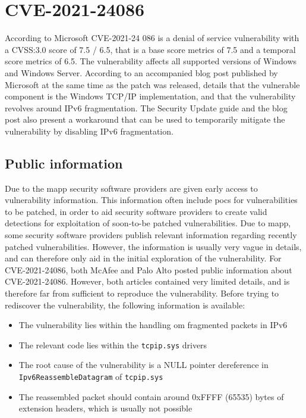 \documentclass{report}
\begin{document}
\section{CVE-2021-24086}
\label{sec:CVE-2021-24086}
According to Microsoft\cite{url:microsoft:cve-2021-24086} CVE-2021-24 086 is a denial of service vulnerability with a CVSS:3.0 score of 7.5 / 6.5, that is a base score metrics of 7.5 and a temporal score metrics of 6.5. The vulnerability affects all supported versions of Windows and Windows Server. According to an accompanied blog post published by Microsoft
\cite{url:microsoft:cve-2021-24086-blog} at the same time as the patch was released, details that the vulnerable component is the Windows TCP/IP implementation, and that the vulnerability revolves around IPv6 fragmentation. The Security Update guide and the blog post also present a workaround that can be used to temporarily mitigate the vulnerability by disabling IPv6 fragmentation.

\subsection{Public information}
\label{sec:CVE-2021-24086:public-information}
Due to the \gls{mapp}\cite{url:microsoft:mapp} security software providers are given early access to vulnerability information. This information often include \gls{poc}s for vulnerabilities to be patched, in order to aid security software providers to create valid detections for exploitation of soon-to-be patched vulnerabilities. Due to \gls{mapp}, some security software providers publish relevant information regarding recently patched vulnerabilities. However, the information is usually very vague in details, and can therefore only aid in the initial exploration of the vulnerability. For CVE-2021-24086, both McAfee\cite{url:mcafee:cve-2021-24086} and Palo Alto\cite{url:palo-alto:cve-2021-24086} posted public information about CVE-2021-24086. However, both articles contained very limited details, and is therefore far from sufficient to reproduce the vulnerability. Before trying to rediscover the vulnerability, the following information is available:

\begin{itemize}
    \item The vulnerability lies within the handling om fragmented packets in IPv6
    \item The relevant code lies within the \texttt{tcpip.sys} drivers
    \item The root cause of the vulnerability is a NULL pointer dereference in \texttt{Ipv6ReassembleDatagram} of \texttt{tcpip.sys}
    \item The reassembled packet should contain around 0xFFFF (65535) bytes of extension headers, which is usually not possible
\end{itemize}
 
\end{document}
